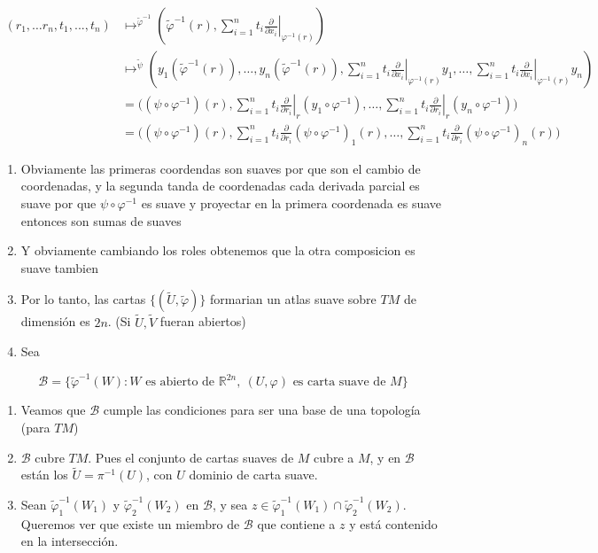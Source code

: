\begin{bookproof}{}
\[
\begin{aligned}(r_{1},\ldots r_{n},t_{1},...,t_{n})&\longmapsto^{\tilde{\varphi}^{-1}} \left(\tilde{\varphi}^{-1}(r),\sum_{i=1}^n t_i\left.\frac{\partial}{\partial x_i}\right|_{\varphi^{-1}(r)}\right)\\&\longmapsto^{\tilde{\psi}}(y_{1}(\tilde{\varphi}^{-1}(r)),\ldots,y_{n}(\tilde{\varphi}^{-1}(r)),\sum_{i=1}^n t_i\left.\frac{\partial}{\partial x_i}\right|_{\varphi^{-1}(r)}y_{1},\ldots,\sum_{i=1}^n t_i\left.\frac{\partial}{\partial x_i}\right|_{\varphi^{-1}(r)}y_{n}) \\&=\bigg((\psi\circ\varphi ^{-1})(r),\sum_{i=1}^n t_i\left.\frac{\partial}{\partial r_i}\right|_{r}(y_{1}\circ\varphi ^{-1}),\ldots,\sum_{i=1}^n t_i\left.\frac{\partial}{\partial r_i}\right|_{r}(y_{n}\circ\varphi ^{-1})\bigg)\\&=\bigg((\psi\circ\varphi ^{-1})(r),\sum_{i=1}^n t_i\frac{\partial}{\partial r_i}(\psi\circ\varphi ^{-1})_{1}(r),\ldots,\sum_{i=1}^n t_i\frac{\partial}{\partial r_i}(\psi\circ\varphi ^{-1})_{n}(r)\bigg)\end{aligned}
\]
\begin{enumerate}[start=9]
\item Obviamente las primeras coordendas son suaves por que son el cambio de coordenadas, y la segunda tanda de coordenadas cada derivada parcial es suave por que $\psi\circ\varphi ^{-1}$ es suave y proyectar en la primera coordenada es suave entonces son sumas de suaves
\item Y obviamente cambiando los roles obtenemos que la otra composicion es suave tambien
\item Por lo tanto, las cartas $\{(\widetilde U,\widetilde\varphi)\}$ formarian un atlas suave sobre $TM$ de dimensión es $2n$. (Si $\tilde{U},\tilde{V}$ fueran abiertos)
\item Sea
\end{enumerate}
\[
\mathcal{B}=\{\tilde{\varphi}^{-1}(W): W \text{ es abierto de } \mathbb{R}^{2n},\ (U,\varphi) \text{ es carta suave de } M\}
\]
\begin{enumerate}[start=13]
\item Veamos que $\mathcal{B}$ cumple las condiciones para ser una base de una topología (para $TM$)
\item $\mathcal{B}$ cubre $TM$. Pues el conjunto de cartas suaves de $M$ cubre a $M$, y en $\mathcal{B}$ están los $\tilde{U}=\pi^{-1}(U)$, con $U$ dominio de carta suave.
\item Sean $\tilde{\varphi}_1^{-1}(W_1)$ y $\tilde{\varphi}_2^{-1}(W_2)$ en $\mathcal{B}$, y sea $z \in \tilde{\varphi}_1^{-1}(W_1)\cap \tilde{\varphi}_2^{-1}(W_2)$. Queremos ver que existe un miembro de $\mathcal{B}$ que contiene a $z$ y está contenido en la intersección.

\end{enumerate}
\end{bookproof}
